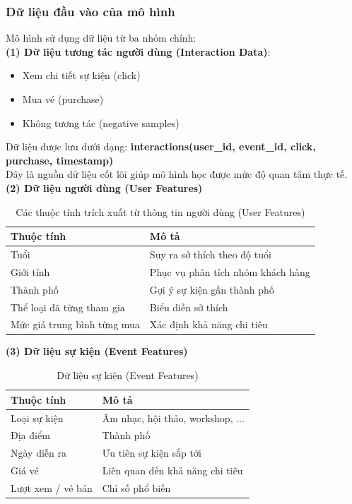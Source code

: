 \subsubsection{Dữ liệu đầu vào của mô hình}
\indent \indent Mô hình sử dụng dữ liệu từ ba nhóm chính:\\
\indent \textbf{(1) Dữ liệu tương tác người dùng (Interaction Data)}: 
\begin{itemize}
    \item[-] Xem chi tiết sự kiện (click)
    \item[-] Mua vé (purchase)
    \item[-] Không tương tác (negative samples)
\end{itemize}
\indent \indent Dữ liệu được lưu dưới dạng: \textbf{interactions(user\_id, event\_id, click, purchase, timestamp)}\\
\indent Đây là nguồn dữ liệu cốt lõi giúp mô hình học được mức độ quan tâm thực tế.\\
\indent \textbf{(2) Dữ liệu người dùng (User Features)}
\begin{table}[H]
\centering
\begin{tabular}{|p{5cm}|p{5.5cm}|}
\hline
\textbf{Thuộc tính} & \textbf{Mô tả} \\ \hline
Tuổi & Suy ra sở thích theo độ tuổi \\ \hline
Giới tính & Phục vụ phân tích nhóm khách hàng \\ \hline
Thành phố & Gợi ý sự kiện gần thành phố \\ \hline
Thể loại đã từng tham gia & Biểu diễn sở thích \\ \hline
Mức giá trung bình từng mua & Xác định khả năng chi tiêu \\ \hline
\end{tabular}
\vspace{15pt}
\caption{Các thuộc tính trích xuất từ thông tin người dùng (User Features)}
\end{table}
\indent \textbf{(3) Dữ liệu sự kiện (Event Features)}
\begin{table}[H]
\centering
\begin{tabular}{|p{5cm}|p{5.5cm}|}
\hline
\textbf{Thuộc tính} & \textbf{Mô tả} \\ \hline
Loại sự kiện & Âm nhạc, hội thảo, workshop, ... \\ \hline
Địa điểm & Thành phố \\ \hline
Ngày diễn ra & Ưu tiên sự kiện sắp tới \\ \hline
Giá vé & Liên quan đến khả năng chi tiêu \\ \hline
Lượt xem / vé bán & Chỉ số phổ biến \\ \hline
\end{tabular}
\vspace{15pt}
\caption{Dữ liệu sự kiện (Event Features)}
\end{table}

